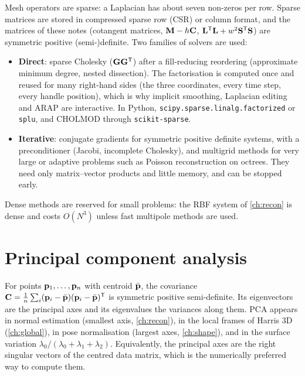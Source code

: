 Mesh operators are sparse: a Laplacian has about seven non-zeros per row. Sparse matrices are stored
in compressed sparse row (CSR) or column format, and the matrices of these notes (cotangent
matrices, $\mathbf{M}-h\mathbf{C}$, $\mathbf{L}^{\mathsf{T}}\mathbf{L}+w^2\mathbf{S}^{\mathsf{T}}\mathbf{S}$) are symmetric positive (semi-)definite. Two families of
solvers are used:
\begin{itemize}
  \item \textbf{Direct}: sparse Cholesky ($\mathbf G\mathbf G^{\mathsf{T}}$) after a fill-reducing reordering
  (approximate minimum degree, nested dissection). The factorisation is computed once and reused for
  many right-hand sides (the three coordinates, every time step, every handle position), which is why
  implicit smoothing, Laplacian editing and ARAP are interactive. In Python,
  \texttt{scipy.sparse.linalg.factorized} or \texttt{splu}, and CHOLMOD through
  \texttt{scikit-sparse}.
  \item \textbf{Iterative}: conjugate gradients for symmetric positive definite systems, with a
  preconditioner (Jacobi, incomplete Cholesky), and multigrid methods for very large or adaptive
  problems such as Poisson reconstruction on octrees. They need only matrix--vector products and
  little memory, and can be stopped early.
\end{itemize}
Dense methods are reserved for small problems: the RBF system of \cref{ch:recon} is dense and costs
$O(N^3)$ unless fast multipole methods are used.

\section{Principal component analysis}

For points $\mathbf{p}_1,\dots,\mathbf{p}_n$ with centroid $\bar{\mathbf{p}}$, the covariance
$\mathbf{C}=\frac1n\sum_i(\mathbf{p}_i-\bar{\mathbf{p}})(\mathbf{p}_i-\bar{\mathbf{p}})^{\mathsf{T}}$ is symmetric positive semi-definite. Its eigenvectors
are the principal axes and its eigenvalues the variances along them. PCA appears in normal estimation
(smallest axis, \cref{ch:recon}), in the local frames of Harris 3D (\cref{ch:global}), in pose
normalisation (largest axes, \cref{ch:shape}), and in the surface variation
$\lambda_0/(\lambda_0+\lambda_1+\lambda_2)$. Equivalently, the principal axes are the right singular
vectors of the centred data matrix, which is the numerically preferred way to compute them.
